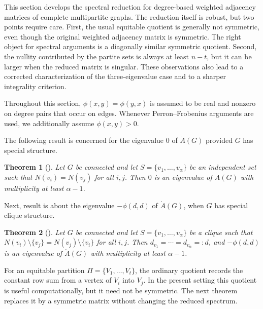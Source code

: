 \documentclass[12pt,twoside]{article}
\newtheorem{theorem}{Theorem}[section]
\begin{document}
This section develops the spectral reduction for degree-based weighted adjacency matrices of complete multipartite graphs. The reduction itself is robust, but two points require care. First, the usual equitable quotient is generally not symmetric, even though the original weighted adjacency matrix is symmetric. The right object for spectral arguments is a diagonally similar symmetric quotient. Second, the nullity contributed by the partite sets is always at least $n-t$, but it can be larger when the reduced matrix is singular. These observations also lead to a corrected characterization of the three-eigenvalue case and to a sharper integrality criterion.

Throughout this section, $\phi(x,y)=\phi(y,x)$ is assumed to be real and nonzero on degree pairs that occur on edges. Whenever Perron--Frobenius arguments are used, we additionally assume $\phi(x,y)>0$.


\medskip
The following result is concerned for the eigenvalue $0$ of $\dot A(G)$ provided $G$ has special structure.
\begin{theorem}[\cite{bilalmdpi}]\label{independence Sombor eigenvalue}
	Let $G$ be connected and let $S=\{v_1,\ldots,v_\alpha\}$ be an independent set such that $N(v_i)=N(v_j)$ for all $i,j$. Then $0$ is an eigenvalue of $\dot A(G)$ with multiplicity at least $\alpha-1$.
\end{theorem}

Next, result is about the eigenvalue $-\phi(d,d)$ of  $\dot A(G)$, when $G$ has special clique structure.
\begin{theorem}[\cite{bilalmdpi}]\label{clique Sombor eigenvalue}
	Let $G$ be connected and let $S=\{v_1,\ldots,v_\alpha\}$ be a clique such that
	$N(v_i)\setminus\{v_j\}=N(v_j)\setminus\{v_i\}$ for all $i,j$. Then $d_{v_1}=\cdots=d_{v_\alpha}=:d$, and $-\phi(d,d)$ is an eigenvalue of $\dot A(G)$ with multiplicity at least $\alpha-1$.
\end{theorem}



For an equitable partition $\Pi=\{V_1,\ldots,V_t\}$, the ordinary quotient records the constant row sum from a vertex of $V_i$ into $V_j$. In the present setting this quotient is useful computationally, but it need not be symmetric. The next theorem replaces it by a symmetric matrix without changing the reduced spectrum.
\end{document}
